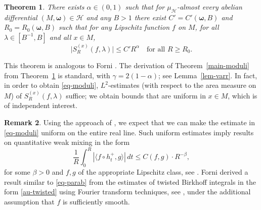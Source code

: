\documentclass[11pt]{article}
\numberwithin{equation}{section}\newcommand{\Relation}[2][]{}\newtheorem*{prop*}{Proposition}
\let\mathcal\mathscr
\theoremstyle{plain}
\newtheorem{theorem}{Theorem}[section]
\theoremstyle{definition}
\newtheorem{remark}[theorem]{Remark}
\newcommand{\omb}{\boldsymbol \omega}
\let\lam\lambda
\let\gam\gamma
\newcommand{\HH}{\mathcal{H}}
\begin{document}
\begin{theorem} \label{th-twisted}
There exists $\alpha\in (0,1)$ such that for $\mu_\HH$-almost every abelian differential $(M, \omb)\in \HH$ and any $B>1$ there exist $C'=C'(\omb,B)$ and $R_0 = R_0(\omb,B)$ such that for any Lipschitz function $f$ on $M$, for all $\lam\in [B^{-1},B]$ and all $x\in M$,
\begin{equation} \label{au-twisted}
\bigl|S_R^{(x)}(f,\lam)\bigr| \le C' R^\alpha\quad\text{for all }R\ge R_0.
\end{equation}
\end{theorem}

This theorem is analogous to Forni \cite[Th.\,1.6]{Forni2}.
The derivation of Theorem~\ref{main-moduli} from Theorem~\ref{th-twisted} is standard, with $\gam = 2(1-\alpha)$; see Lemma~\ref{lem-varr}. In fact, in order to obtain \eqref{eq-moduli}, $L^2$-estimates (with respect to
the area measure on $M$) of $S_R^{(x)}(f,\lam)$ suffice; we obtain bounds that are uniform in $x\in M$, which is of independent interest.

\begin{remark}
Using the approach of \cite{BuSo18b}, we expect that we can make the estimate in \eqref{eq-moduli} uniform
on the entire real line.
Such uniform estimates imply results on quantitative weak mixing in the form
\begin{equation} \label{eq-parab}
\frac{1}{R} \int_0^R \left|\langle f\circ h_t^+, g\rangle\right|\,dt \le C(f,g) \cdot R^{-\beta},
\end{equation}
for some $\beta>0$ and $f,g$ of the appropriate Lipschitz class, see \cite[Th.\,1.1]{BuSo18b}.
Forni \cite[Cor.\,1.8]{Forni2} derived a result similar to \eqref{eq-parab} from the estimates of twisted Birkhoff integrals in the form \eqref{au-twisted} using Fourier transform techniques, see
\cite[Lem.\,9.3]{Forni2}, under the additional assumption that $f$ is sufficiently smooth.
\end{remark}
\end{document}
